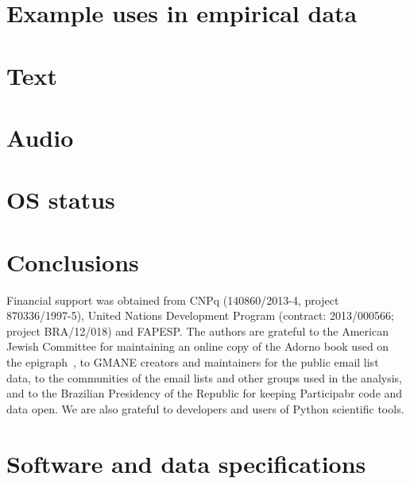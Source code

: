 \documentclass[%
	aip,
	jmp,%
	amsmath,amssymb,
	reprint,%
]{revtex4-1}
\begin{document}
\section{Example uses in empirical data}\label{sec:empirical}


\section{Text}





\section{Audio}
\section{OS status}

\section{Conclusions}\label{sec:conc}
\begin{acknowledgments}
	Financial support was obtained from CNPq (140860/2013-4,
	project 870336/1997-5), United Nations Development Program (contract: 2013/000566; project BRA/12/018) and FAPESP. 
	The authors are grateful to the American Jewish Committee for maintaining an online copy of the Adorno book used on the epigraph~\cite{adorno}, to GMANE creators and maintainers for the public email list data, to the communities of the email lists and other groups used in the analysis, and to the Brazilian Presidency of the Republic for keeping Participabr code and data open.
	We are also grateful to developers and users of Python scientific tools.
\end{acknowledgments}


\appendix
\section{Software and data specifications}\label{ap:soft}


\end{document}
